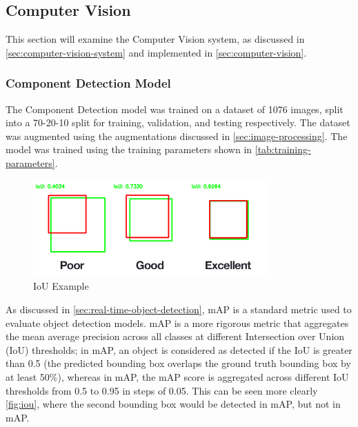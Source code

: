
\subsection{Computer Vision}
\label{sec:computer-vision-evaluation}
This section will examine the Computer Vision system, as discussed in \autoref{sec:computer-vision-system} and implemented in \autoref{sec:computer-vision}.

\subsubsection{Component Detection Model}
The Component Detection model was trained on a dataset of 1076 images, split into a 70-20-10 split for training, validation, and testing respectively. The dataset was augmented using the augmentations discussed in \autoref{sec:image-processing}. The model was trained using the training parameters shown in \autoref{tab:training-parameters}.

\begin{figure}[H]
    \centering
    \includegraphics[width=0.8\textwidth]{imgs/articles/iou.png}
    \caption{IoU Example \cite{rosebrock_2016}}
    \label{fig:iou}
  \end{figure}
  
As discussed in \autoref{sec:real-time-object-detection}, mAP is a standard metric used to evaluate object detection models. mAP is a more rigorous metric that aggregates the mean average precision across all classes at different Intersection over Union (IoU) thresholds; in mAP, an object is considered as detected if the IoU is greater than 0.5 (the predicted bounding box overlaps the ground truth bounding box by at least 50\%), whereas in mAP, the mAP score is aggregated across different IoU thresholds from 0.5 to 0.95 in steps of 0.05. This can be seen more clearly \autoref{fig:iou}, where the second bounding box would be detected in mAP, but not in mAP.
  
